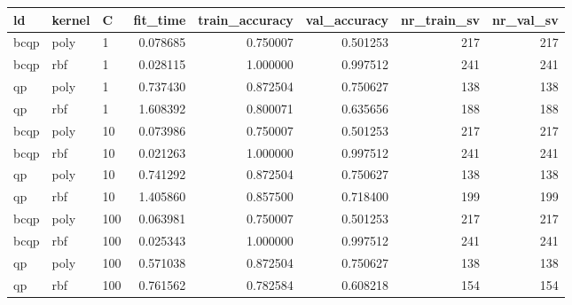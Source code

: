 \begin{tabular}{lllrrrrr}
\toprule
  ld & kernel &   C &  fit\_time &  train\_accuracy &  val\_accuracy &  nr\_train\_sv &  nr\_val\_sv \\
\midrule
bcqp &   poly &   1 &  0.078685 &        0.750007 &      0.501253 &          217 &        217 \\
bcqp &    rbf &   1 &  0.028115 &        1.000000 &      0.997512 &          241 &        241 \\
  qp &   poly &   1 &  0.737430 &        0.872504 &      0.750627 &          138 &        138 \\
  qp &    rbf &   1 &  1.608392 &        0.800071 &      0.635656 &          188 &        188 \\
bcqp &   poly &  10 &  0.073986 &        0.750007 &      0.501253 &          217 &        217 \\
bcqp &    rbf &  10 &  0.021263 &        1.000000 &      0.997512 &          241 &        241 \\
  qp &   poly &  10 &  0.741292 &        0.872504 &      0.750627 &          138 &        138 \\
  qp &    rbf &  10 &  1.405860 &        0.857500 &      0.718400 &          199 &        199 \\
bcqp &   poly & 100 &  0.063981 &        0.750007 &      0.501253 &          217 &        217 \\
bcqp &    rbf & 100 &  0.025343 &        1.000000 &      0.997512 &          241 &        241 \\
  qp &   poly & 100 &  0.571038 &        0.872504 &      0.750627 &          138 &        138 \\
  qp &    rbf & 100 &  0.761562 &        0.782584 &      0.608218 &          154 &        154 \\
\bottomrule
\end{tabular}

